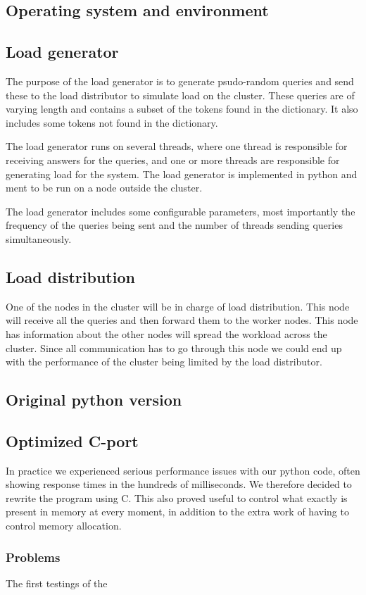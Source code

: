 \subsection{Operating system and environment}
\subsection{Load generator}
The purpose of the load generator is to generate psudo-random queries and send these to the load distributor to simulate load on the cluster. These queries are of varying length and contains a subset of the tokens found in the dictionary. It also includes some tokens not found in the dictionary.

The load generator runs on several threads, where one thread is responsible for receiving answers for the queries, and one or more threads are responsible for generating load for the system. The load generator is implemented in python and ment to be run on a node outside the cluster.

The load generator includes some configurable parameters, most importantly the frequency of the queries being sent and the number of threads sending queries simultaneously.

\subsection{Load distribution}
One of the nodes in the cluster will be in charge of load distribution. This node will receive all the queries and then forward them to the worker nodes. This node has information about the other nodes will spread the workload across the cluster. Since all communication has to go through this node we could end up with the performance of the cluster being limited by the load distributor.

\subsection{Original python version}

\subsection{Optimized C-port}
In practice we experienced serious performance issues with our python code, often showing response times in the hundreds of milliseconds. We therefore decided to rewrite the program using C. This also proved useful to control what exactly is present in memory at every moment, in addition to the extra work of having to control memory allocation.
\subsubsection{Problems}
The first testings of the

